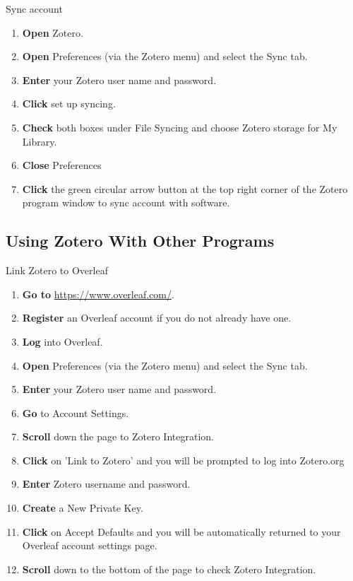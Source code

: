 \documentclass[10pt,a4paper]{article}
\begin{document}
\begin{textbox}{Sync account}
 

  

\begin{enumerate}
\item \textbf{Open} Zotero.
\item \textbf{Open} Preferences (via the Zotero menu) and select the Sync tab.
\item \textbf {Enter} your Zotero user name and password.
\item \textbf {Click} set up syncing.
\item \textbf {Check} both boxes under File Syncing and choose Zotero storage for My Library.
\item \textbf {Close} Preferences
\item \textbf {Click} the green circular arrow button at the top right corner of the Zotero program window to sync account with software.
\end{enumerate}

\end{textbox}

\subsection{Using Zotero With Other Programs}

\begin{textbox}{Link Zotero to Overleaf}
 

  

\begin{enumerate}
\item \textbf{Go to}  \href{https://www.overleaf.com/}{https://www.overleaf.com/}. 
\item \textbf{Register} an Overleaf account if you do not already have one.
\item \textbf{Log} into Overleaf.
\item \textbf{Open} Preferences (via the Zotero menu) and select the Sync tab.
\item \textbf {Enter} your Zotero user name and password.
\item \textbf {Go} to Account Settings.
\item \textbf {Scroll} down the page to Zotero Integration.
\item \textbf {Click} on 'Link to Zotero' and you will be prompted to log into Zotero.org
\item \textbf {Enter} Zotero username and password.
\item \textbf {Create} a New Private Key.
\item \textbf {Click} on Accept Defaults and you will be automatically returned to your Overleaf account settings page.
\item \textbf {Scroll} down to the bottom of the page to check Zotero Integration.
\end{enumerate}

\end{textbox}
\end{document}
